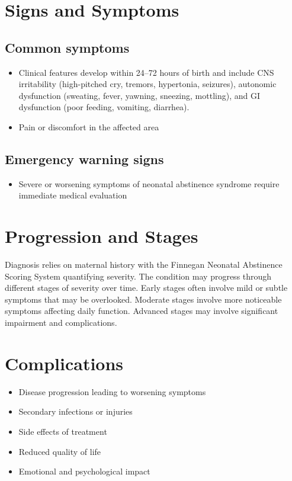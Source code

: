 \section{Signs and Symptoms}

\subsection{Common symptoms}
\begin{itemize}[noitemsep]
  \item Clinical features develop within 24--72 hours of birth and include CNS irritability (high-pitched cry, tremors, hypertonia, seizures), autonomic dysfunction (sweating, fever, yawning, sneezing, mottling), and GI dysfunction (poor feeding, vomiting, diarrhea).

  \item Pain or discomfort in the affected area
  \end{itemize}

\subsection{Emergency warning signs}
\begin{itemize}[noitemsep]
  \item Severe or worsening symptoms of neonatal abstinence syndrome require immediate medical evaluation
\end{itemize}
\section{Progression and Stages}
Diagnosis relies on maternal history with the Finnegan Neonatal Abstinence Scoring System quantifying severity. The condition may progress through different stages of severity over time. Early stages often involve mild or subtle symptoms that may be overlooked. Moderate stages involve more noticeable symptoms affecting daily function. Advanced stages may involve significant impairment and complications.
\section{Complications}
\begin{itemize}[noitemsep]
  \item Disease progression leading to worsening symptoms
  \item Secondary infections or injuries
  \item Side effects of treatment
  \item Reduced quality of life
  \item Emotional and psychological impact
\end{itemize}
